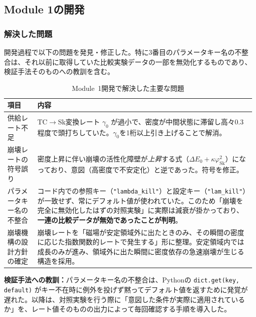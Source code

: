 \documentclass[11pt,a4paper]{ltjsarticle}
\begin{document}
\subsection{Module 1の開発}

\subsubsection{解決した問題}

開発過程で以下の問題を発見・修正した。特に3番目のパラメータキー名の不整合は、それ以前に取得していた比較実験データの一部を無効化するものであり、検証手法そのものへの教訓を含む。

\begin{table}[htbp]
\centering
\caption{Module~1開発で解決した主要な問題}
\label{tab:module1_issues}
\small
\begin{tabular}{@{}p{38mm}p{105mm}@{}}
\toprule
\textbf{項目} & \textbf{内容} \\
\midrule
供給レート不足 &
TC$\rightarrow$Sk変換レート $\gamma_0$ が過小で、密度が中間状態に滞留し高々0.3程度で頭打ちしていた。$\gamma_0$を1桁以上引き上げることで解消。 \\
\addlinespace
崩壊レートの符号誤り &
密度上昇に伴い崩壊の活性化障壁が\textit{上昇}する式（$\Delta E_0 + \kappa\varphi_\mathrm{Sk}^2$）になっており、意図（高密度で不安定化）と逆であった。符号を修正。 \\
\addlinespace
パラメータキー名の不整合 &
コード内での参照キー（\texttt{"lambda\_kill"}）と設定キー（\texttt{"lam\_kill"}）が一致せず、常にデフォルト値が使われていた。このため「崩壊を完全に無効化したはずの対照実験」に実際は減衰が掛かっており、\textbf{一連の比較データが無効であったことが判明}。 \\
\addlinespace
崩壊機構の設計方針の確定 &
崩壊レートを「磁場が安定領域外に出たときのみ、その瞬間の密度に応じた指数関数的レートで発生する」形に整理。安定領域内では成長のみが進み、領域外に出た瞬間に密度依存の急速崩壊が生じる構造を採用。 \\
\bottomrule
\end{tabular}
\end{table}

\begin{cautionbox}
\textbf{検証手法への教訓：}パラメータキー名の不整合は、Pythonの \texttt{dict.get(key, default)} がキー不在時に例外を投げず黙ってデフォルト値を返すために発覚が遅れた。以降は、対照実験を行う際に「意図した条件が実際に適用されているか」を、レート値そのものの出力によって毎回確認する手順を導入した。
\end{cautionbox}
\end{document}
